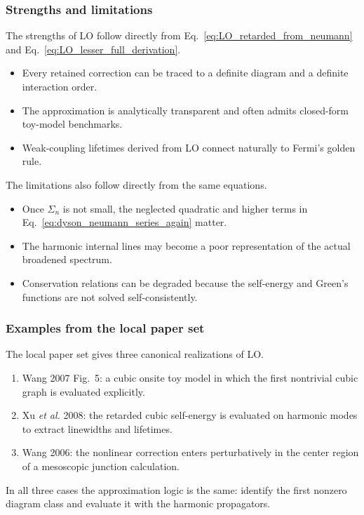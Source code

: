 \subsubsection{Strengths and limitations}
The strengths of LO follow directly from Eq.~\eqref{eq:LO_retarded_from_neumann} and Eq.~\eqref{eq:LO_lesser_full_derivation}.
\begin{itemize}
\item Every retained correction can be traced to a definite diagram and a definite interaction order.
\item The approximation is analytically transparent and often admits closed-form toy-model benchmarks.
\item Weak-coupling lifetimes derived from LO connect naturally to Fermi's golden rule.
\end{itemize}
The limitations also follow directly from the same equations.
\begin{itemize}
\item Once $\Sigma_n$ is not small, the neglected quadratic and higher terms in Eq.~\eqref{eq:dyson_neumann_series_again} matter.
\item The harmonic internal lines may become a poor representation of the actual broadened spectrum.
\item Conservation relations can be degraded because the self-energy and Green's functions are not solved self-consistently.
\end{itemize}

\subsubsection{Examples from the local paper set}
The local paper set gives three canonical realizations of LO.
\begin{enumerate}[label=\arabic*.]
\item Wang 2007 Fig.~5: a cubic onsite toy model in which the first nontrivial cubic graph is evaluated explicitly.
\item Xu \emph{et al.} 2008: the retarded cubic self-energy is evaluated on harmonic modes to extract linewidths and lifetimes.
\item Wang 2006: the nonlinear correction enters perturbatively in the center region of a mesoscopic junction calculation.
\end{enumerate}
In all three cases the approximation logic is the same: identify the first nonzero diagram class and evaluate it with the harmonic propagators.

